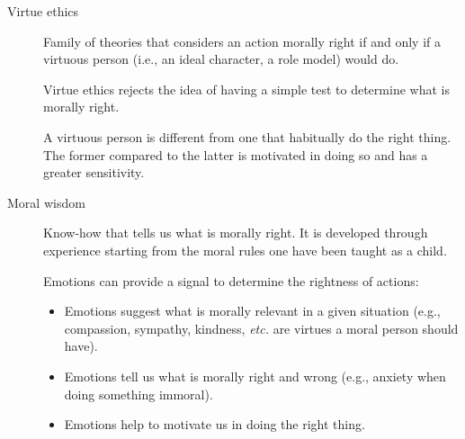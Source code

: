 \begin{description}
    \item[Virtue ethics] 
        Family of theories that considers an action morally right if and only if a virtuous person (i.e., an ideal character, a role model) would do.

        \begin{remark}
            Virtue ethics rejects the idea of having a simple test to determine what is morally right.
        \end{remark}

        \begin{remark}
            A virtuous person is different from one that habitually do the right thing. The former compared to the latter is motivated in doing so and has a greater sensitivity.
        \end{remark}

    \item[Moral wisdom] 
        Know-how that tells us what is morally right. It is developed through experience starting from the moral rules one have been taught as a child.

        \begin{remark}
            Emotions can provide a signal to determine the rightness of actions:
            \begin{itemize}
                \item Emotions suggest what is morally relevant in a given situation (e.g., compassion, sympathy, kindness, \textit{etc.} are virtues a moral person should have).
                \item Emotions tell us what is morally right and wrong (e.g., anxiety when doing something immoral).
                \item Emotions help to motivate us in doing the right thing.
            \end{itemize}
        \end{remark}
\end{description}

